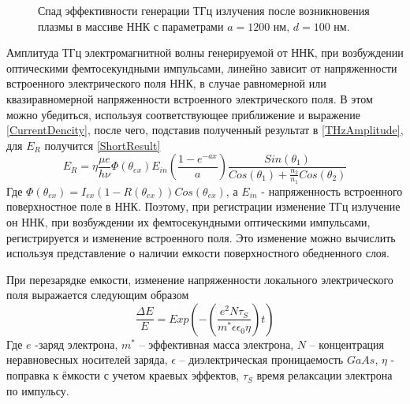 \documentclass[a4paper,14pt,russian]{extreport}
\begin{document}
				\begin{figure}[H]
					\caption{Спад эффективности генерации ТГц излучения после возникновения плазмы в массиве ННК с параметрами $a = 1200 \text{ нм, } d = 100 \text{ нм}$.}
				\label{ris:short1200100}
				\end{figure}
				Амплитуда ТГц электромагнитной волны генерируемой от ННК, при возбуждении оптическими фемтосекундными импульсами, линейно зависит от напряженности встроенного электрического поля ННК, в случае равномерной или квазиравномерной напряженности встроенного электрического поля. В этом можно убедиться, используя соответствующее приближение и выражение \ref{CurrentDencity}, после чего, подставив полученный результат в \ref{THzAmplitude}, для $E_R$ получится \ref{ShortResult}
				\begin{equation}\label{ShortResult}
					E_R = \eta \frac{\mu e}{h \nu}\Phi(\theta_{ex}) E_{in} \left( \frac{1-e^{-a x}}{a} \right) \frac{Sin(\theta_1)}{Cos(\theta_1)+\frac{n_2}{n_1}Cos(\theta_2)}
				\end{equation}
				Где $\Phi(\theta_{ex}) = I_{ex}(1-R(\theta_{ex}))Cos(\theta_{ex})$, а $E_{in}$ - напряженность встроенного поверхностное поле в ННК. Поэтому, при регистрации изменение ТГц излучение он ННК, при возбуждении их фемтосекундными оптическими импульсами, регистрируется и изменение встроенного поля. Это изменение можно вычислить используя представление о наличии емкости поверхностного обедненного слоя.\par
				При перезарядке емкости, изменение напряженности локального электрического поля выражается следующим образом 
				\begin{equation}\label{Effectivity}
					\frac{\Delta E}{E} = Exp\left(-\left(\frac{e^2N\tau_S}{m^*\epsilon \epsilon_0 \eta}\right)t\right)
				\end{equation}
				Где $e$ -заряд электрона, $m^*$ – эффективная масса электрона, $N$ – концентрация неравновесных носителей заряда, $\epsilon$ – диэлектрическая проницаемость $GaAs$, $\eta$ - поправка к ёмкости с учетом краевых эффектов, $\tau_S$ время релаксации электрона по импульсу.\par
\end{document}
